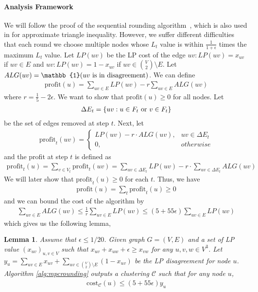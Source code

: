 \documentclass[11pt]{article}
\newcommand{\cost}{\mathrm{cost}}
\newtheorem{lemma}[theorem]{Lemma}
\newcommand{\calC}{{\mathcal{C}}}
\newcommand{\profit}{\mathrm{profit}}
\newcommand{\onefive}{\frac{1}{5}}
\begin{document}
\begin{CJK*}{UTF8}{gbsn}
\paragraph{Analysis Framework} We will follow the proof of the sequential rounding algorithm~\cite{kalhan2019correlation}, which is also used in \cite{davies2023fast} for approximate triangle inequality. However, we suffer different difficulties that each round we choose multiple nodes whose $L_t$ value is within $\frac{1}{1 + \epsilon}$ times the maximum $L_t$ value. Let $LP(uv)$ be the LP cost of the edge $uv: LP(uv) = x_{uv}$ if $uv \in E$ and
$uv: LP(uv) = 1 - x_{uv}$ if $uv \in {V\choose2} \setminus E$. Let $ALG(uv) = \mathbb{1}(uv \textmd{ is in disagreement})$. We can define 
\begin{align*}
    \profit(u) = \sum_{uv \in E} LP(uv) - r \sum_{uv \in E} ALG(uv)
\end{align*}
where $r = \onefive - 2\epsilon$. We want to show that $\profit(u) \geq 0$ for all nodes. Let 
\begin{align*}
    \Delta E_t = \{ uv: u \in F_t \textmd{ or } v \in F_t\}
\end{align*}
be the set of edges removed at step $t$. Next, let 
\begin{align*}
    \profit_t(uv) =  \begin{cases}
            LP(uv) - r \cdot ALG(uv), &uv\in \Delta E_t\\
            0, &otherwise
        \end{cases}
\end{align*}
and the profit at step $t$ is defined as
\begin{align*}
    \profit_t(u) = \sum_{v \in V_t} \profit_t(uv) = \sum_{uv \in \Delta E_t} LP(uv) - r \cdot \sum_{uv \in \Delta E_t} ALG(uv)
\end{align*}
We will later show that $\profit_t(u) \geq 0$ for each $t$. Thus, we have 
\begin{align*}
    \profit(u) = \sum_{t} \profit_t(u) \geq 0
\end{align*}
and we can bound the cost of the algorithm by 
\begin{align*}
    \sum_{uv \in E} ALG(uv) \leq \frac{1}{r} \sum_{uv \in E} LP(uv) \leq (5 + 55 \epsilon) \sum_{uv \in E} LP(uv)
\end{align*}
which gives us the following lemma,
\begin{lemma}
\label{lem:correctnessofRoundnig}
Assume that $\epsilon \leq 1/ 20$. Given graph $G = (V, E)$ and a set of LP value $ (x_{uv})_{u,v \in V} $ such that $x_{uv} + x_{uw} + \epsilon \geq x_{vw}$ for any $u,v,w \in V^3$. Let $y_u = \sum_{uv \in E} x_{uv} + \sum_{uv \in {V \choose 2} \setminus E}(1 - x_{uv})$ be the LP disagreement for node $u$. Algorithm \ref{alg:mpcrounding} outputs a clustering $\calC$ such that for any node $u$,
\begin{align*}
    \cost_\calC(u) \leq (5 + 55\epsilon) y_u
\end{align*}
\end{lemma}


\end{CJK*}
\end{document}
